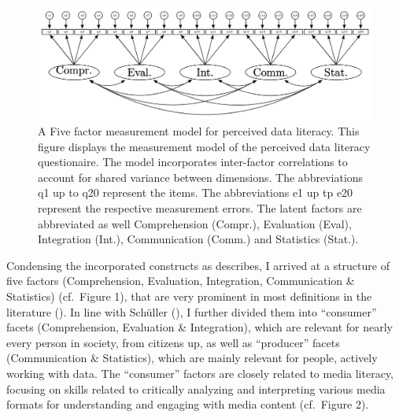 \documentclass[
  12pt,
  a4paper,
  twoside]{article}
\begin{document}
\begin{figure}

{\centering \includegraphics[width=1\linewidth]{images/Models_MA} 

}

\caption{\footnotesize{A Five factor measurement model for perceived data literacy. This figure displays the measurement model of the perceived data literacy questionaire. The model incorporates inter-factor correlations to account for shared variance between dimensions. The abbreviations q1 up to q20 represent the items. The abbreviations e1 up tp e20 represent the respective measurement errors. The latent factors are abbreviated as well Comprehension (Compr.), Evaluation (Eval), Integration (Int.), Communication (Comm.) and Statistics (Stat.).}}\label{fig:model1}
\end{figure}

Condensing the incorporated constructs as describes, I arrived at a structure of five factors (Comprehension, Evaluation, Integration, Communication \& Statistics) (cf.~Figure 1), that are very prominent in most definitions in the literature (). In line with Schüller (), I further divided them into ``consumer'' facets (Comprehension, Evaluation \& Integration), which are relevant for nearly every person in society, from citizens up, as well as ``producer'' facets (Communication \& Statistics), which are mainly relevant for people, actively working with data. The ``consumer'' factors are closely related to media literacy, focusing on skills related to critically analyzing and interpreting various media formats for understanding and engaging with media content (cf.~Figure 2).
\end{document}
